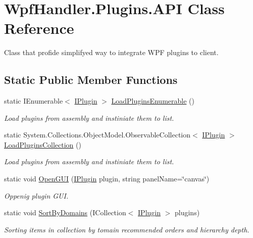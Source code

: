 \hypertarget{class_wpf_handler_1_1_plugins_1_1_a_p_i}{}\section{Wpf\+Handler.\+Plugins.\+A\+PI Class Reference}
\label{class_wpf_handler_1_1_plugins_1_1_a_p_i}


Class that profide simplifyed way to integrate W\+PF plugins to client.  


\subsection*{Static Public Member Functions}
\begin{DoxyCompactItemize}
\item 
static I\+Enumerable$<$ \mbox{\hyperlink{interface_wpf_handler_1_1_plugins_1_1_i_plugin}{I\+Plugin}} $>$ \mbox{\hyperlink{class_wpf_handler_1_1_plugins_1_1_a_p_i_ae2d2c46617f63533ddc20f08166b6c6e}{Load\+Plugins\+Enumerable}} ()
\begin{DoxyCompactList}\small\item\em Load plugins from assembly and instiniate them to list. \end{DoxyCompactList}\item 
static System.\+Collections.\+Object\+Model.\+Observable\+Collection$<$ \mbox{\hyperlink{interface_wpf_handler_1_1_plugins_1_1_i_plugin}{I\+Plugin}} $>$ \mbox{\hyperlink{class_wpf_handler_1_1_plugins_1_1_a_p_i_aa797a592049cf57860ee422586fcccac}{Load\+Plugins\+Collection}} ()
\begin{DoxyCompactList}\small\item\em Load plugins from assembly and instiniate them to list. \end{DoxyCompactList}\item 
static void \mbox{\hyperlink{class_wpf_handler_1_1_plugins_1_1_a_p_i_a4dbfd1cc62cfb8def6f17d8c622e0fd8}{Open\+G\+UI}} (\mbox{\hyperlink{interface_wpf_handler_1_1_plugins_1_1_i_plugin}{I\+Plugin}} plugin, string panel\+Name=\char`\"{}canvas\char`\"{})
\begin{DoxyCompactList}\small\item\em Oppenig plugin G\+UI. \end{DoxyCompactList}\item 
static void \mbox{\hyperlink{class_wpf_handler_1_1_plugins_1_1_a_p_i_aaa094e4b6d27c336e8f0f76acc04ba20}{Sort\+By\+Domains}} (I\+Collection$<$ \mbox{\hyperlink{interface_wpf_handler_1_1_plugins_1_1_i_plugin}{I\+Plugin}} $>$ plugins)
\begin{DoxyCompactList}\small\item\em Sorting items in collection by tomain recommended orders and hierarchy depth. \end{DoxyCompactList}\end{DoxyCompactItemize}


